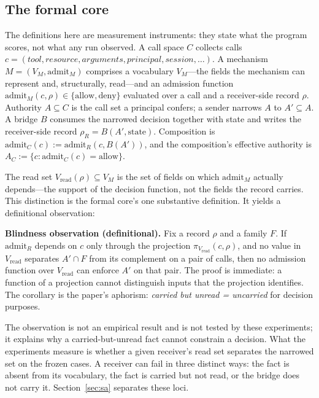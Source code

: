 \documentclass[sigconf,anonymous,nonacm]{acmart}
\begin{document}
\subsection{The formal core}
\label{sec:formal}

The definitions here are measurement instruments: they state what the program scores, not what any run observed. A call space $C$ collects calls $c=(\mathit{tool},\mathit{resource},\mathit{arguments},\mathit{principal},\mathit{session},\ldots)$. A mechanism $M=(V_M,\mathrm{admit}_M)$ comprises a vocabulary $V_M$---the fields the mechanism can represent and, structurally, read---and an admission function $\mathrm{admit}_M(c,\rho)\in\{\mathrm{allow},\mathrm{deny}\}$ evaluated over a call and a receiver-side record $\rho$. Authority $A\subseteq C$ is the call set a principal confers; a sender narrows $A$ to $A'\subseteq A$. A bridge $B$ consumes the narrowed decision together with state and writes the receiver-side record $\rho_R=B(A',\mathrm{state})$. Composition is $\mathrm{admit}_C(c)\mathrel{:=}\mathrm{admit}_R(c,B(A'))$, and the composition's effective authority is $A_C\mathrel{:=}\{c:\mathrm{admit}_C(c)=\mathrm{allow}\}$.

The read set $V_{\mathrm{read}}(\rho)\subseteq V_M$ is the set of fields on which $\mathrm{admit}_M$ actually depends---the support of the decision function, not the fields the record carries. This distinction is the formal core's one substantive definition. It yields a definitional observation:

\textbf{Blindness observation (definitional).} Fix a record $\rho$ and a family $F$. If $\mathrm{admit}_R$ depends on $c$ only through the projection $\pi_{V_{\mathrm{read}}}(c,\rho)$, and no value in $V_{\mathrm{read}}$ separates $A'\cap F$ from its complement on a pair of calls, then no admission function over $V_{\mathrm{read}}$ can enforce $A'$ on that pair. The proof is immediate: a function of a projection cannot distinguish inputs that the projection identifies. The corollary is the paper's aphorism: \emph{carried but unread = uncarried} for decision purposes.

The observation is not an empirical result and is not tested by these experiments; it explains why a carried-but-unread fact cannot constrain a decision. What the experiments measure is whether a given receiver's read set separates the narrowed set on the frozen cases. A receiver can fail in three distinct ways: the fact is absent from its vocabulary, the fact is carried but not read, or the bridge does not carry it. Section~\ref{sec:sa} separates these loci.
\end{document}
